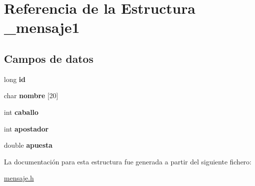 \hypertarget{struct__mensaje1}{}\section{Referencia de la Estructura \+\_\+mensaje1}
\label{struct__mensaje1}
\subsection*{Campos de datos}
\begin{DoxyCompactItemize}
\item 
\mbox{\label{struct__mensaje1_a735004a9b897c5a88f5dcf24b3f583c6}} 
long {\bfseries id}
\item 
\mbox{\label{struct__mensaje1_a29c34ea869872fd81bc0371cbf16271d}} 
char {\bfseries nombre} \mbox{[}20\mbox{]}
\item 
\mbox{\label{struct__mensaje1_a69160e4a42ae59fcb659b18ab6c76214}} 
int {\bfseries caballo}
\item 
\mbox{\label{struct__mensaje1_a1433f0a3185a88b3304bcbc0ff301c04}} 
int {\bfseries apostador}
\item 
\mbox{\label{struct__mensaje1_ab319876ee59bb000d256e4cc179d9ded}} 
double {\bfseries apuesta}
\end{DoxyCompactItemize}


La documentación para esta estructura fue generada a partir del siguiente fichero\+:\begin{DoxyCompactItemize}
\item 
\hyperlink{mensaje_8h}{mensaje.\+h}\end{DoxyCompactItemize}
